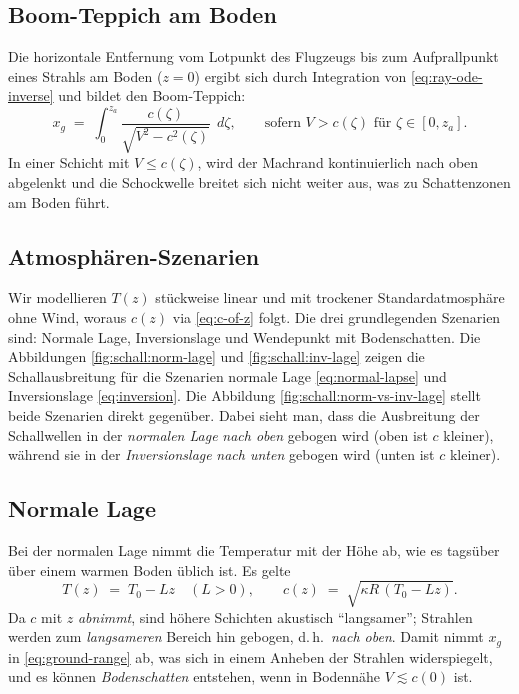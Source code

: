 \subsection{Boom-Teppich am Boden}
Die horizontale Entfernung vom Lotpunkt des Flugzeugs bis zum
Aufprallpunkt eines Strahls am Boden ($z=0$) ergibt sich durch
Integration von \eqref{eq:ray-ode-inverse} und bildet den Boom-Teppich:
\begin{equation}
    \quad
    x_g \;=\; \int_{0}^{z_a} \frac{c(\zeta)}{\sqrt{V^2 - c^2(\zeta)}}\;\, d\zeta,
    \qquad \text{sofern } V>c(\zeta) \text{ für } \zeta\in[0,z_a].
    \quad
    \label{eq:ground-range}
\end{equation}
In einer Schicht mit $V\le c(\zeta)$, wird der Machrand kontinuierlich
nach oben abgelenkt und die Schockwelle breitet sich nicht weiter aus,
was zu Schattenzonen am Boden führt.

\subsection{Atmosphären-Szenarien}\label{schall:subsection:atmos-scenarios}
Wir modellieren $T(z)$ stückweise linear und mit trockener
Standardatmosphäre ohne Wind, woraus $c(z)$ via \eqref{eq:c-of-z} folgt.
Die drei grundlegenden Szenarien sind: Normale Lage, Inversionslage und
Wendepunkt mit Bodenschatten.
Die Abbildungen \ref{fig:schall:norm-lage} und \ref{fig:schall:inv-lage}
zeigen die Schallausbreitung für die Szenarien normale Lage
\eqref{eq:normal-lapse} und Inversionslage \eqref{eq:inversion}.
Die Abbildung \ref{fig:schall:norm-vs-inv-lage} stellt beide Szenarien
direkt gegenüber.
Dabei sieht man, dass die Ausbreitung der Schallwellen
in der \emph{normalen Lage} \emph{nach oben} gebogen wird (oben ist $c$ kleiner),
während sie in der \emph{Inversionslage} \emph{nach unten} gebogen wird (unten ist $c$ kleiner).

\subsection*{Normale Lage}
Bei der normalen Lage nimmt die Temperatur mit der Höhe ab,
wie es tagsüber über einem warmen Boden üblich ist.
Es gelte
\begin{equation}
    T(z) \;=\; T_0 - Lz \quad (L>0),
    \qquad
    c(z) \;=\; \sqrt{\kappa R\,(T_0 - Lz)} .
    \label{eq:normal-lapse}
\end{equation}
Da $c$ mit $z$ \emph{abnimmt}, sind höhere Schichten akustisch
``langsamer''; Strahlen werden zum \emph{langsameren} Bereich hin
gebogen, d.\,h.\ \emph{nach oben}.
Damit nimmt $x_g$ in \eqref{eq:ground-range} ab, was sich in einem Anheben
der Strahlen widerspiegelt, und es können \emph{Bodenschatten}
entstehen, wenn in Bodennähe $V\lesssim c(0)$ ist.

